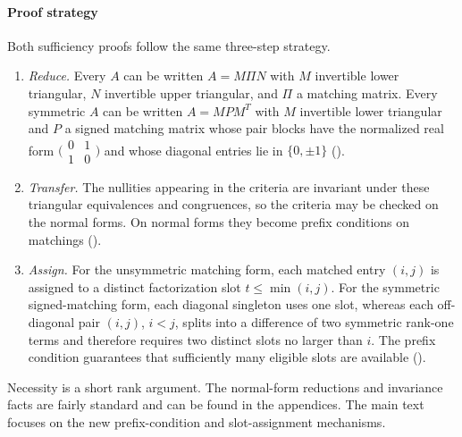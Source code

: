 \documentclass[preprint,12pt]{elsarticle}
\theoremstyle{plain}
\theoremstyle{nonumberplain}
\numberwithin{equation}{section}
\numberwithin{theorem}{section}
\begin{document}
\paragraph{Proof strategy}
Both sufficiency proofs follow the same three-step strategy.
\begin{enumerate}
  \item \emph{Reduce.}  Every $A$ can be written $A=M\Pi N$ with $M$ invertible lower triangular, $N$ invertible upper triangular, and $\Pi$ a matching matrix.  Every symmetric $A$ can be written $A=MPM^T$ with $M$ invertible lower triangular and $P$ a signed matching matrix whose pair blocks have the normalized real form
    $\bigl(
      \begin{smallmatrix}0&1\\1&0
      \end{smallmatrix}
    \bigr)$
    and whose diagonal entries lie in $\{0, \pm 1\}$ ().
  \item \emph{Transfer.}  The nullities appearing in the criteria are invariant under these triangular equivalences and congruences, so the criteria may be checked on the normal forms.  On normal forms they become prefix conditions on matchings ().
  \item \emph{Assign.}  For the unsymmetric matching form, each matched entry $(i,j)$ is assigned to a distinct factorization slot $t\le\min(i,j)$. For the symmetric signed-matching form, each diagonal singleton uses one slot, whereas each off-diagonal pair $(i,j)$, $i<j$, splits into a difference of two symmetric rank-one terms and therefore requires two distinct slots no larger than $i$. The prefix condition guarantees that sufficiently many eligible slots are available ().
\end{enumerate}
Necessity is a short rank argument. The normal-form reductions and invariance facts are fairly standard and can be found in the appendices. The main text focuses on the new prefix-condition and slot-assignment mechanisms.
\end{document}
